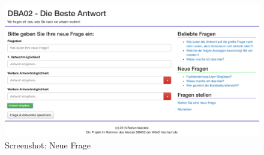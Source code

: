 \begin{appendix}
\begin{figure}[h]
\includegraphics[width=\textwidth]{scr-neuefrage.jpg}
\caption{Screenshot: Neue Frage}
\label{scr:neuefrage}
\end{figure}

\end{appendix}